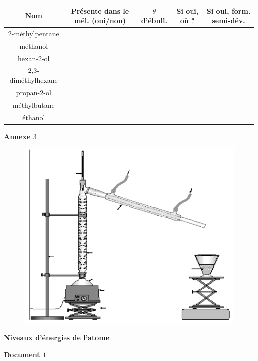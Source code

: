 \begin{center}
\begin{tabular}{|c|c|c|c|c|}
\hline
Nom & Présente dans le mél. (oui/non) & $\theta$ d'ébull. & Si oui, où ? & Si oui, form. semi-dév. \\
\hline
2-méthylpentane     &   &   &   &   \\
\hline
méthanol            &   &   &   &   \\
\hline
hexan-2-ol          &   &   &   &   \\
\hline
2,3-diméthylhexane  &   &   &   &   \\
\hline
propan-2-ol         &   &   &   &   \\
\hline
méthylbutane        &   &   &   &   \\
\hline
éthanol             &   &   &   &   \\
\hline
\end{tabular}
\end{center}

\vspace{0.3cm}

\textbf{Annexe $3$}

\begin{figure}[h]
\begin{center}
\includegraphics[width=0.5\columnwidth]{images/Exo6_Alcanes_Alcools_Annexe3}
\end{center}
\end{figure}


\newpage

\exo \textbf{Niveaux d'énergies de l'atome}

\vspace{0.3cm}

\textbf{Document $1$}

